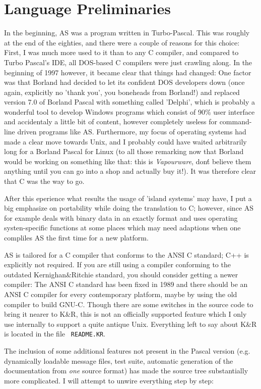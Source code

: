 \documentclass[12pt,twoside]{report}
\begin{document}
\section{Language Preliminaries}

In the beginning, AS was a program written in Turbo-Pascal.  This was
roughly at the end of the eighties, and there were a couple of reasons for
this choice: First, I was much more used to it than to any C compiler, and
compared to Turbo Pascal's IDE, all DOS-based C compilers were just
crawling along.  In the beginning of 1997 however, it became clear that
things had changed: One factor was that Borland had decided to let its
confident DOS developers down (once again, explicitly no 'thank you', you
boneheads from Borland!) and replaced version 7.0 of Borland Pascal with
something called 'Delphi', which is probably a wonderful tool to develop
Windows programs which consist of 90\% user interface and accidentaly a
little bit of content, however completely useless for command-line driven
programs like AS.  Furthermore, my focus of operating systems had made a
clear move towards Unix, and I probably could have waited arbitrarily long
for a Borland Pascal for Linux (to all those remarking now that Borland
would be working on something like that: this is {\em Vapourware}, don\'t
believe them anything until you can go into a shop and actually buy it!).
It was therefore clear that C was the way to go.

After this eperience what results the usage of 'island systems' may have,
I put a big emphasize on portability while doing the translation to C;
however, since AS for example deals with binary data in an exactly format
and uses operating systen-specific functions at some places which may need
adaptions when one compliles AS the first time for a new platform.

AS is tailored for a C compiler that conforms to the ANSI C standard; C++
is explicitly not required.  If you are still using a compiler conforming
to the outdated Kernighan\&Ritchie standard, you should consider getting a
newer compiler: The ANSI C standard has been fixed in 1989 and there
should be an ANSI C compiler for every contemporary platform, maybe by
using the old compiler to build GNU-C.  Though there are some switches in
the source code to bring it nearer to K\&R, this is not an officially
supported feature which I only use internally to support a quite antique
Unix.  Everything left to say about K\&R is located in the file {\tt
README.KR}.

The inclusion of some additional features not present in the Pascal
version (e.g. dynamically loadable message files, test suite, automatic
generation of the documentation from {\em one} source format) has made the
source tree substantially more complicated.  I will attempt to unwire
everything step by step:
\end{document}
